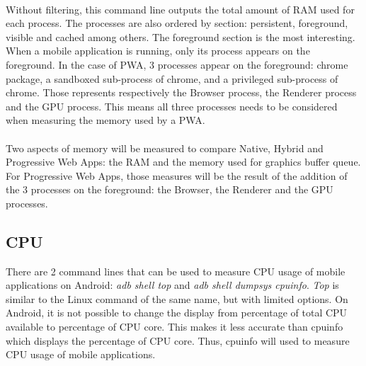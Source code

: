 \documentclass{kththesis}
\begin{document}
\paragraph{}
Without filtering, this command line outputs the total amount of RAM used for each process. The processes are also ordered by section: persistent, foreground, visible and cached among others. \newline
The foreground section is the most interesting. When a mobile application is running, only its process appears on the foreground. In the case of PWA, 3 processes appear on the foreground:  chrome package, a sandboxed sub-process of chrome, and a privileged sub-process of chrome. Those represents respectively the Browser process, the Renderer process and the GPU process. This means all three processes needs to be considered when measuring the memory used by a PWA. 


\paragraph{}
Two aspects of memory will be measured to compare Native, Hybrid and Progressive Web Apps: the RAM and the memory used for graphics buffer queue. For Progressive Web Apps, those measures will be the result of the addition of the 3 processes on the foreground: the Browser, the Renderer and the GPU processes.
    
\subsection{CPU}

There are 2 command lines that can be used to measure CPU usage of mobile applications on Android: \textit{adb shell top} and \textit{adb shell dumpsys cpuinfo}. \textit{Top} is similar to the Linux command of the same name, but with limited options. On Android, it is not possible to change the display from percentage of total CPU available to percentage of CPU core. This makes it less accurate than cpuinfo which displays the percentage of CPU core. Thus, cpuinfo will used to measure CPU usage of mobile applications. 
\end{document}

